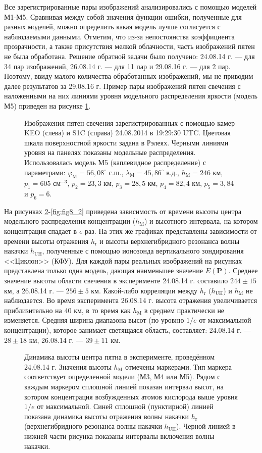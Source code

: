 \documentclass[12pt,a4paper]{article}
\renewcommand{\vec}{\mathbf}
\begin{document}
Все зарегистрированные пары изображений анализировались с помощью моделей М1-М5. Сравнивая между собой значения функции ошибки, полученные для разных моделей, можно определить какая модель лучше согласуется с наблюдаемыми данными. Отметим, что из-за непостоянства коэффициента прозрачности, а также присутствия мелкой облачности, часть изображений пятен не была обработана. Решение обратной задачи было получено: 24.08.14 г. --- для 34 пар изображений, 26.08.14 г. --- для 11 пар и 29.08.16 г. --- для 2 пар. Поэтому, ввиду малого количества обработанных изображений, мы не приводим далее результатов за 29.08.16 г. Пример пары изображений пятен свечения с наложенными на них линиями уровня модельного распределения яркости (модель М5) приведен на рисунке \ref{fig:fig7}.
\begin{figure}[h]
	\caption{Изображения пятен свечения зарегистрированных с помощью камер KEO (слева) и S1C (справа) 24.08.2014 в 19:29:30 UTC. Цветовая шкала поверхностной яркости задана в Рэлеях. Черными линиями уровня на панелях показаны модельные распределения. Использовалась модель М5 (каплевидное распределение) с параметрами: $\varphi_\text{M}=56,08^\circ$ с.ш., $\lambda_\text{M}=45,86^\circ$ в.д., $h_\text{M}=246$ км, $p_1=605$ см$^{-3}$, $p_2=23,3$ км, $p_3=28,5$ км, $p_4=82,4$ км, $p_5=3,84$ и $p_6=6$.}
	\label{fig:fig7}
\end{figure}
На рисунках \ref{fig:fig8_1}-\ref{fig:fig8_2} приведена зависимость от времени высоты центра модельного распределения концентрации ($h_\text{M}$) и высотного интервала, на котором концентрация спадает в $e$ раз. На этих же графиках представлены зависимости от времени высоты отражения $h_\text{r}$ и высоты верхнегибридного резонанса волны накачки $h_\text{UH}$, полученные с помощью ионозонда вертикального зондирования <<Циклон>> (КФУ). Для каждой пары реальных изображений на рисунках представлена только одна модель, дающая наименьшее значение $E(\vec{P})$. Среднее значение высоты области свечения в эксперименте 24.08.14 г. составило $244\pm15$ км, а 26.08.14 г. --- $256\pm5$ км. Какой-либо корреляции между $h_\text{r}$ ($h_\text{UH}$) и $h_\text{M}$ не наблюдается. Во время эксперимента 26.08.14 г. высота отражения увеличивается приблизительно на 40 км, в то время как $h_\text{M}$ в среднем практически не изменяется. Средняя ширина диапазона высот (по уровню $1/e$ от максимальной концентрации), которое занимает светящаяся область, составляет: 24.08.14 г. --- $28\pm18$ км, 26.08.14 г. --- $39\pm 11$ км. 
\begin{figure}[h]
	\caption{Динамика высоты центра пятна в эксперименте, проведённом 24.08.14 г. Значения высоты $h_\text{M}$ отмечены маркерами. Тип маркера соответствует определенной модели (М3, М4 или М5). Рядом с каждым маркером сплошной линией показан интервал высот, на котором концентрация возбужденных атомов кислорода выше уровня $1/e$ от максимальной. Синей сплошной (пунктирной) линией показана динамика высоты отражения волны накачки $h_\text{r}$ (верхнегибридного резонанса волны накачки $h_\text{UH}$). Черной линией в нижней части рисунка показаны интервалы включения волны накачки.}
	\label{fig:fig8_1}
\end{figure}	
\end{document}
